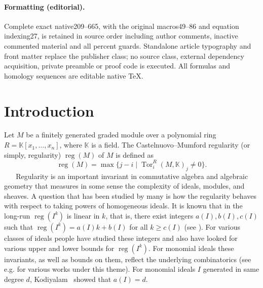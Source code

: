 \documentclass[10pt]{article}
\theoremstyle{definition}
\numberwithin{equation}{section}
\newcommand \reg{\operatorname{reg}}
\newcommand \Tor{\operatorname{Tor}}
\newcommand \K{\mathbb{K}}
\begin{document}
\paragraph{Formatting (editorial).} Complete exact native209--665, with the original macros49--86 and equation indexing27, is retained in source order including author comments, inactive commented material and all percent guards. Standalone article typography and front matter replace the publisher class; no source class, external dependency acquisition, private preamble or proof code is executed. All formulas and homology sequences are editable native TeX.
\clearpage
\section{Introduction}
Let $M$ be a finitely generated graded module over a polynomial ring $R = \K[x_1,\ldots,x_n]$, where
$\K$ is a field. The Castelnuovo--Mumford regularity (or simply, regularity) $\reg(M)$ of $M$
is defined as
$$
 \reg(M)=\max \{j-i \mid \Tor_i^R(M, \K)_j \neq 0\}.
$$
 $\text{  }$ $\text{  }$Regularity  is an important invariant in commutative algebra and algebraic geometry that measures in some sense the complexity of ideals, modules, and sheaves. A question that has been studied by many is how the regularity behaves with respect to taking powers of homogeneous ideals. It is known that in the long-run $\reg(I^k)$ is linear in $k$, that is, there exist integers $a(I), b(I), c(I)$ such that $\reg(I^k) = a(I)k + b(I)$ for all $k\geq c(I)$ (see \cite{CHT,vijay}). For various classes of ideals people have studied these integers and also have looked for various upper and lower bounds for $\reg(I^k)$.
 For monomial ideals these invariants, as well as bounds on them, reflect the underlying combinatorics (see e.g. \cite{BBH17,ha_adam2,Herzog'sBook,ms2005,MorVill,Nevo} for various works under this theme).
 For monomial ideals $I$ generated in same degree $d$, Kodiyalam~\cite{vijay} showed that $a(I)=d$.
\end{document}
